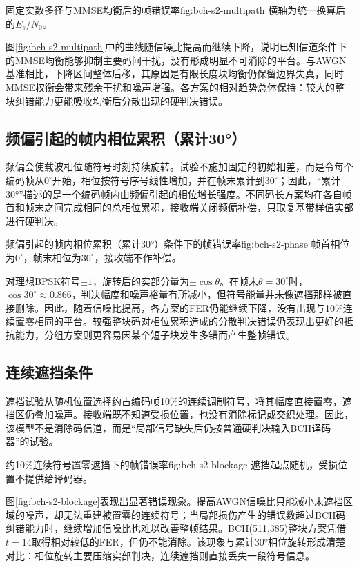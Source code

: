   {固定实数多径与MMSE均衡后的帧错误率}{fig:bch-s2-multipath}
  {横轴为统一换算后的$E_s/N_0$。}

图\ref{fig:bch-s2-multipath}中的曲线随信噪比提高而继续下降，说明已知信道条件下的MMSE均衡能够抑制主要码间干扰，没有形成明显不可消除的平台。与AWGN基准相比，下降区间整体后移，其原因是有限长度块均衡仍保留边界失真，同时MMSE权衡会带来残余干扰和噪声增强。各方案的相对趋势总体保持：较大的整块纠错能力更能吸收均衡后分散出现的硬判决错误。

\subsection{频偏引起的帧内相位累积（累计30°）}

频偏会使载波相位随符号时刻持续旋转。试验不施加固定的初始相差，而是令每个编码帧从$0^\circ$开始，相位按符号序号线性增加，并在帧末累计到$30^\circ$；因此，“累计30°”描述的是一个编码帧内由频偏引起的相位增长强度。不同码长方案均在各自帧首和帧末之间完成相同的总相位累积，接收端关闭频偏补偿，只取复基带样值实部进行硬判决。

  {频偏引起的帧内相位累积（累计30°）条件下的帧错误率}{fig:bch-s2-phase}
  {帧首相位为$0^\circ$，帧末相位为$30^\circ$，接收端不作补偿。}

对理想BPSK符号$\pm1$，旋转后的实部分量为$\pm\cos\theta$。在帧末$\theta=30^\circ$时，$\cos30^\circ\approx0.866$，判决幅度和噪声裕量有所减小，但符号能量并未像遮挡那样被直接删除。因此，随着信噪比提高，各方案的FER仍能继续下降，没有出现与10\%连续置零相同的平台。较强整块码对相位累积造成的分散判决错误仍表现出更好的抵抗能力，分组方案则更容易因某个短子块发生多错而产生整帧错误。

\subsection{连续遮挡条件}

遮挡试验从随机位置选择约占编码帧10\%的连续调制符号，将其幅度直接置零，遮挡区仍叠加噪声。接收端既不知道受损位置，也没有消除标记或交织处理。因此，该模型不是消除码信道，而是“局部信号缺失后仍按普通硬判决输入BCH译码器”的试验。

  {约10\%连续符号置零遮挡下的帧错误率}{fig:bch-s2-blockage}
  {遮挡起点随机，受损位置不提供给译码器。}

图\ref{fig:bch-s2-blockage}表现出显著错误现象。提高AWGN信噪比只能减小未遮挡区域的噪声，却无法重建被置零的连续符号；当局部损伤产生的错误数超过BCH码纠错能力时，继续增加信噪比也难以改善整帧结果。BCH(511,385)整块方案凭借$t=14$取得相对较低的FER，但仍不能消除。该现象与累计30°相位旋转形成清楚对比：相位旋转主要压缩实部判决，连续遮挡则直接丢失一段符号信息。

